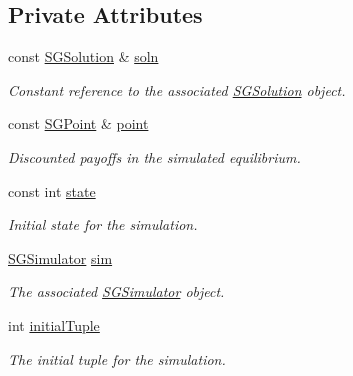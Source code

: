 \subsection*{Private Attributes}
\begin{DoxyCompactItemize}
\item 
\mbox{\label{classSGSimulationHandler_a4bf1ba537ca2d4faf364f0c6464d4c2d}} 
const \hyperlink{classSGSolution}{S\+G\+Solution} \& \hyperlink{classSGSimulationHandler_a4bf1ba537ca2d4faf364f0c6464d4c2d}{soln}
\begin{DoxyCompactList}\small\item\em Constant reference to the associated \hyperlink{classSGSolution}{S\+G\+Solution} object. \end{DoxyCompactList}\item 
const \hyperlink{classSGPoint}{S\+G\+Point} \& \hyperlink{classSGSimulationHandler_afe0ae445ab03e1413aecf88542f57e89}{point}
\begin{DoxyCompactList}\small\item\em Discounted payoffs in the simulated equilibrium. \end{DoxyCompactList}\item 
\mbox{\label{classSGSimulationHandler_a612f5235a97b2a4a615440ad70e6b7bb}} 
const int \hyperlink{classSGSimulationHandler_a612f5235a97b2a4a615440ad70e6b7bb}{state}
\begin{DoxyCompactList}\small\item\em Initial state for the simulation. \end{DoxyCompactList}\item 
\mbox{\label{classSGSimulationHandler_ae5fd342ff5b0d0dfcd726a00118ffc68}} 
\hyperlink{classSGSimulator}{S\+G\+Simulator} \hyperlink{classSGSimulationHandler_ae5fd342ff5b0d0dfcd726a00118ffc68}{sim}
\begin{DoxyCompactList}\small\item\em The associated \hyperlink{classSGSimulator}{S\+G\+Simulator} object. \end{DoxyCompactList}\item 
\mbox{\label{classSGSimulationHandler_a9a1a8438136f1d5aa165a0aeb6696f8b}} 
int \hyperlink{classSGSimulationHandler_a9a1a8438136f1d5aa165a0aeb6696f8b}{initial\+Tuple}
\begin{DoxyCompactList}\small\item\em The initial tuple for the simulation. \end{DoxyCompactList}\item 

\end{DoxyCompactItemize}
